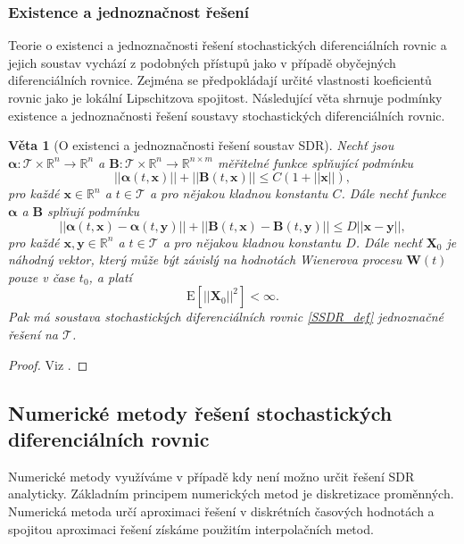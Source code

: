 \documentclass[a4paper,12pt]{report}
\newtheorem{veta}{Věta}
\theoremstyle{definition} \newtheorem{definice}[veta]{Definice}
\theoremstyle{remark}
\begin{document}
\subsubsection{Existence a jednoznačnost řešení}
Teorie o existenci a jednoznačnosti řešení stochastických diferenciálních rovnic a jejich soustav vychází z podobných přístupů jako v případě obyčejných diferenciálních rovnice.
Zejména se předpokládají určité vlastnosti koeficientů rovnic jako je lokální Lipschitzova spojitost.
Následující věta shrnuje podmínky existence a jednoznačnosti řešení soustavy stochastických diferenciálních rovnic.
\begin{veta}[O existenci a jednoznačnosti řešení soustav SDR]
Nechť jsou $\boldsymbol\alpha:\mathcal{T}\times\mathbb{R}^n\to\mathbb{R}^n$ a $\boldsymbol{B}:\mathcal{T}\times\mathbb{R}^n\to\mathbb{R}^{n\times m}$ měřitelné funkce splňující podmínku
\begin{equation}\label{glob_Lipschitzova_podminka}
||\boldsymbol\alpha( t,\boldsymbol x)||+||\boldsymbol{B}( t,\boldsymbol x)||\leq C(1+{||\boldsymbol x||}),
\end{equation}
pro každé $\boldsymbol x\in\mathbb{R}^n$ a $t\in \mathcal{T}$ a pro nějakou kladnou konstantu $C$.
Dále nechť funkce $\boldsymbol\alpha$ a $\boldsymbol B$ splňují podmínku
\begin{equation}\label{loc_Lipschitzova_podminka}
||\boldsymbol\alpha( t,\boldsymbol x)-\boldsymbol\alpha( t,\boldsymbol y)||+||\boldsymbol{B}( t,\boldsymbol x)-\boldsymbol{B}( t,\boldsymbol y)||\leq D||\boldsymbol x-\boldsymbol y||,
\end{equation}
pro každé $\boldsymbol x , \boldsymbol y\in\mathbb{R}^n$ a $t\in \mathcal{T}$ a pro nějakou kladnou konstantu $D$.
Dále nechť $\boldsymbol X_0$ je náhodný vektor, který může být závislý na hodnotách Wienerova procesu $\boldsymbol W(t)$ pouze v čase $t_0$,%
a platí
\begin{equation}\label{podminka_tri}
\mathrm{E}\left[||\boldsymbol X_0||^2\right]<\infty.
\end{equation} 
Pak má soustava stochastických diferenciálních rovnic \eqref{SSDR_def} jednoznačné řešení na $\mathcal{T}$.
\end{veta}
\begin{proof}
Viz \cite{oksendal2003stochastic}.
\end{proof}

\subsection{Numerické metody řešení stochastických diferenciálních rovnic}
Numerické metody využíváme v případě kdy není možno určit řešení SDR analyticky.
Základním principem numerických metod je diskretizace proměnných.
Numerická metoda určí aproximaci řešení v diskrétních časových hodnotách a spojitou aproximaci řešení získáme použitím interpolačních metod.
\end{document}
